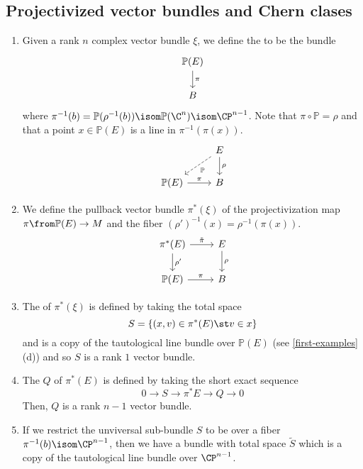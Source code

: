 \documentclass[11pt,leqno,oneside]{amsbook}
\renewcommand{\P}{\mathbb{P}}
\numberwithin{thm}{section}
\begin{document}
\subsection{Projectivized vector bundles and Chern clases}
\begin{defn}\label{projectivization}
  \begin{enumerate}
  \item Given a rank \(n\) complex vector bundle \(\xi\), we define
    the \de{projectivized bundle \(\P(\xi)\)} to be the
    bundle \[
      \begin{tikzcd}
        \P(E) \ar[d, "\pi"] \\
        B
      \end{tikzcd}
    \]
    where \(\pi^{-1}(b) = \P(\rho^{-1}(b)) \isom \P(\C^n) \isom \CP^{n-1}\). Note that
    \(\pi \circ \P = \rho\) and that a point \(x \in \P(E)\) is a
    line in \(\pi^{-1}(\pi(x))\). \[
      \begin{tikzcd}
        & E \ar[d, "\rho"] \ar[ld, dashed, "\P"]\\
      \P(E) \ar[r, "\pi"] & B
      \end{tikzcd}
    \]
   \item We define the pullback vector bundle \(\pi^*(\xi)\) of the
     projectivization map 
    \(\pi \from \P(E) \to M\) and the
    fiber \((\rho')^{-1}(x) = \rho^{-1}(\pi(x))\). \[
      \begin{tikzcd}
        \pi^*(E) \ar[r,"\tilde{\pi}"] \ar[d, "\rho'"] & E
        \ar[d,"\rho"] \\ 
        \P(E) \ar[r, "\pi"] & B
      \end{tikzcd}
    \]
  \item The  of \(\pi^*(\xi)\) is defined by
    taking the total space \[
      S = \{(x,v) \in \pi^*(E) \st v \in x\} 
    \]
    and is a copy of the tautological line bundle over \(\P(E)\) (see
    \ref{first-examples}(d)) and so \(S\) is a rank \(1\) vector
    bundle.
  \item The  \(Q\) of \(\pi^*(E)\) is
    defined by taking the short exact sequence \[
      0 \to S \to \pi^*E \to Q \to 0
    \]
    Then, \(Q\) is a rank \(n-1\) vector bundle.
  \item If we restrict the unviversal sub-bundle \(S\) to be over a
    fiber \(\pi^{-1}(b) \isom \CP^{n-1}\), then we have a bundle with
    total space \(\tilde{S}\) which is a copy of the tautological
    line bundle over \(\CP^{n-1}\).
  \end{enumerate}
\end{defn}
\end{document}
